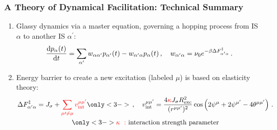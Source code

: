 \begin{frame}
\frametitle{A Theory of Dynamical Facilitation: Technical Summary}

\begin{enumerate}
    \item<1-> Glassy dynamics via a master equation, governing a hopping process from IS $\alpha$ to another IS $\alpha^\prime$:
    \begin{gather*}
    \frac{\diff p_\alpha(t)}{\diff t} = \sum_{\alpha^\prime} w_{\alpha \alpha^\prime} p_{\alpha^\prime}(t) - w_{\alpha^\prime \alpha}p_\alpha(t) \,, 
    \quad w_{\alpha^\prime \alpha } = \nu_\mathrm{0} e^{-\beta \Delta F_{\alpha^\prime \alpha}^\ddagger} \,. %
    \end{gather*}
    \item<2-> Energy barrier to create a new excitation (labeled $\mu$) is based on elasticity theory:
    \begin{gather*}
    \Delta F_{\alpha^\prime \alpha}^\ddagger = J_\sigma + \km{\sum_{\mu \prime \neq \mu} v_\mathrm{int}^{\mu  \mu^\prime}} \only<3->{\,, \quad  v^{\mu \mu^\prime}_\mathrm{int} =
    \frac{4\km{\kappa}J_\sigma R_\mathrm{exc}^2}{(r^{\mu \mu^\prime})^2} \cos \left( 2\psi^\mu+2\psi^{\mu^\prime}-4\theta^{\mu \mu^\prime} \right) \,.
    }
    \\
    \only<3->{\km{\kappa \ :} \ \text{interaction strength parameter}}
    \end{gather*}
\end{enumerate}
\end{frame}

